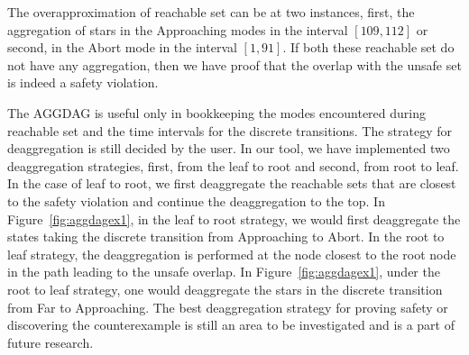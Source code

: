 \begin{example}
The overapproximation of reachable set can be at two instances, first, the aggregation of stars in the Approaching modes in the interval $[109, 112]$ or second, in the Abort mode in the interval $[1,91]$.  If both these reachable set do not have any aggregation, then we have proof that the overlap with the unsafe set is indeed a safety violation. 
\end{example}



The AGGDAG is useful only in bookkeeping the modes encountered during reachable set and the time intervals for the discrete transitions. The strategy for deaggregation is still decided by the user. In our tool, we have implemented two deaggregation strategies, first, from the leaf to root and second, from root to leaf. In the case of leaf to root, we first deaggregate the reachable sets that are closest to the safety violation and continue the deaggregation to the top. In Figure~\ref{fig:aggdagex1}, in the leaf to root strategy, we would first deaggregate the states taking the discrete transition from Approaching to Abort. In the root to leaf strategy, the deaggregation is performed at the node closest to the root node in the path leading to the unsafe overlap. In Figure~\ref{fig:aggdagex1}, under the root to leaf strategy, one would deaggregate the stars in the discrete transition from Far to Approaching. The best deaggregation strategy for proving safety or discovering the counterexample is still an area to be investigated and is a part of future research.






